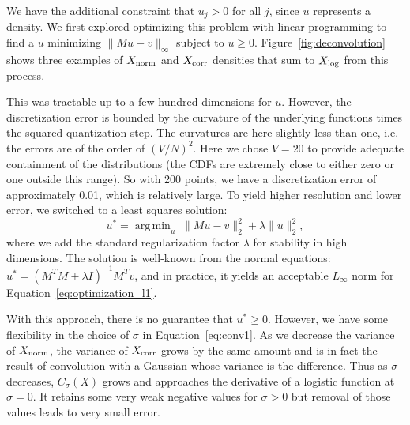 \documentclass{article}
\DeclareMathOperator*{\argmin}{arg\,min}
\begin{document}
We have the additional constraint that $u_j > 0$ for all $j$, since $u$
represents a density. We first explored optimizing this problem with linear
programming to find a $u$ minimizing $\|Mu - v\|_\infty$ subject to $u \ge 0$.
Figure~\ref{fig:deconvolution} shows three examples of $X_{\rm norm}$ and
$X_{\rm corr}$ densities that sum to $X_{\rm log}$ from this process.

This was tractable up to a few hundred dimensions for $u$.  However, the
discretization error is bounded by the curvature of the underlying functions
times the squared quantization step. The curvatures are here slightly less than
one, i.e.  the errors are of the order of $(V/N)^2$.  Here we chose $V=20$ to
provide adequate containment of the distributions (the CDFs are extremely close
to either zero or one outside this range). So with 200 points, we have a
discretization error of approximately 0.01, which is relatively large.  To yield
higher resolution and lower error, we switched to a least squares solution:
\begin{equation}\label{eq:optimization_l2}
    u^* = \argmin_u\; \|Mu-v\|_2^2 + \lambda \|u\|_2^2,
\end{equation}
where we add the standard regularization factor $\lambda$ for stability in high
dimensions. The solution is well-known from the normal equations: $u^* = (M^TM +
\lambda I)^{-1}M^Tv$, and in practice, it yields an acceptable $L_{\infty}$ norm for
Equation~\ref{eq:optimization_l1}.

With this approach, there is no guarantee that $u^* \geq 0$. However, we have
some flexibility in the choice of $\sigma$ in Equation~\ref{eq:conv1}.
As we decrease the variance of $X_{\rm norm}$, the variance of $X_{\rm corr}$
grows by the same amount and is in fact the result of convolution with a
Gaussian whose variance is the difference.  Thus as $\sigma$ decreases,
$C_\sigma(X)$ grows and approaches the derivative of a logistic function at
$\sigma = 0$. It retains some very weak negative values for $\sigma > 0$ but
removal of those values leads to very small error.
\end{document}
